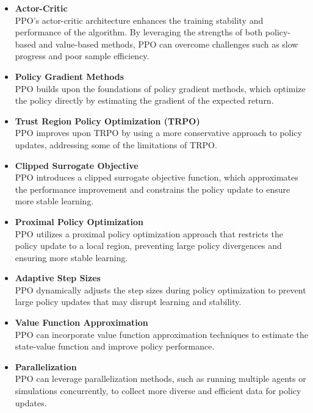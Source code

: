 \begin{itemize}

\item {\bf Actor-Critic }\\
PPO's actor-critic architecture enhances the training stability and performance of the algorithm. By leveraging the strengths of both policy-based and value-based methods, PPO can overcome challenges such as slow progress and poor sample efficiency.

\item {\bf Policy Gradient Methods }\\
PPO builds upon the foundations of policy gradient methods, which optimize the policy directly by estimating the gradient of the expected return.

\item {\bf Trust Region Policy Optimization (TRPO) }\\
PPO improves upon TRPO by using a more conservative approach to policy updates, addressing some of the limitations of TRPO.

\item {\bf Clipped Surrogate Objective }\\
PPO introduces a clipped surrogate objective function, which approximates the performance improvement and constrains the policy update to ensure more stable learning.

\item {\bf Proximal Policy Optimization }\\
PPO utilizes a proximal policy optimization approach that restricts the policy update to a local region, preventing large policy divergences and ensuring more stable learning.

\item {\bf Adaptive Step Sizes }\\
PPO dynamically adjusts the step sizes during policy optimization to prevent large policy updates that may disrupt learning and stability.

\item {\bf Value Function Approximation }\\
PPO can incorporate value function approximation techniques to estimate the state-value function and improve policy performance.

\item {\bf Parallelization }\\
PPO can leverage parallelization methods, such as running multiple agents or simulations concurrently, to collect more diverse and efficient data for policy updates.

\end{itemize}


